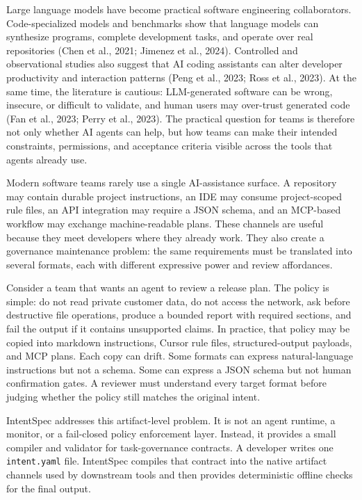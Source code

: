 \documentclass[11pt]{article}
\begin{document}
Large language models have become practical software engineering collaborators.
Code-specialized models and benchmarks show that language models can synthesize
programs, complete development tasks, and operate over real repositories (Chen et
al., 2021; Jimenez et al., 2024). Controlled and observational studies also suggest
that AI coding assistants can alter developer productivity and interaction patterns
(Peng et al., 2023; Ross et al., 2023). At the same time, the literature is cautious:
LLM-generated software can be wrong, insecure, or difficult to validate, and human
users may over-trust generated code (Fan et al., 2023; Perry et al., 2023). The
practical question for teams is therefore not only whether AI agents can help, but
how teams can make their intended constraints, permissions, and acceptance criteria
visible across the tools that agents already use.

Modern software teams rarely use a single AI-assistance surface. A repository may
contain durable project instructions, an IDE may consume project-scoped rule files,
an API integration may require a JSON schema, and an MCP-based workflow may exchange
machine-readable plans. These channels are useful because they meet developers where
they already work. They also create a governance maintenance problem: the same
requirements must be translated into several formats, each with different expressive
power and review affordances.

Consider a team that wants an agent to review a release plan. The policy is simple:
do not read private customer data, do not access the network, ask before destructive
file operations, produce a bounded report with required sections, and fail the
output if it contains unsupported claims. In practice, that policy may be copied
into markdown instructions, Cursor rule files, structured-output payloads, and MCP
plans. Each copy can drift. Some formats can express natural-language instructions
but not a schema. Some can express a JSON schema but not human confirmation gates. A
reviewer must understand every target format before judging whether the policy still
matches the original intent.

IntentSpec addresses this artifact-level problem. It is not an agent runtime, a
monitor, or a fail-closed policy enforcement layer. Instead, it provides a small
compiler and validator for task-governance contracts. A developer writes one
\texttt{intent.yaml} file. IntentSpec compiles that contract into the native
artifact channels used by downstream tools and then provides deterministic offline
checks for the final output.
\end{document}
